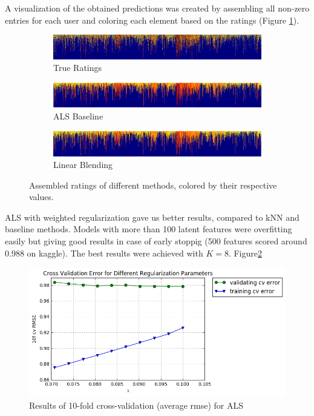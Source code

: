 A visualization of the obtained predictions was created by 
assembling all non-zero entries for each user and coloring each element
based on the ratings (Figure \ref{fig:matrix}).   

\begin{figure}[!tbp]
  \begin{subfigure}[b]{0.99\columnwidth}
    \includegraphics[width=.99\columnwidth]{figures/matrix_validation_clipped.png}
    \caption{True Ratings}
  \end{subfigure}
  \hfill
  \begin{subfigure}[b]{0.99\columnwidth}
    \includegraphics[width=.99\columnwidth]{figures/matrix_validation_1_clipped.png}
    \caption{ALS Baseline}
  \end{subfigure}
  \begin{subfigure}[b]{0.99\columnwidth}
    \includegraphics[width=.99\columnwidth]{figures/matrix_blending_clipped.png}
    \caption{Linear Blending}
  \end{subfigure}
  \caption{Assembled ratings of different methods, colored by their respective
  values.}
  \label{fig:matrix}
\end{figure}

ALS with weighted regularization gave us better results, compared to kNN and
baseline methods. Models with more than 100 latent features were overfitting easily but giving good results in case of early stoppig (500 features scored around 0.988 on kaggle). The best results were achieved with $K=8$. Figure\ref{fig:als_cv}
 
\begin{figure}[!tbp]
  \centering
  \includegraphics[width=.9\columnwidth]{figures/scaled_trainavg_testavg.png}
  \caption{Results of 10-fold cross-validation (average rmse) for ALS}
  \label{fig:als_cv}
  \centering
\end{figure}

